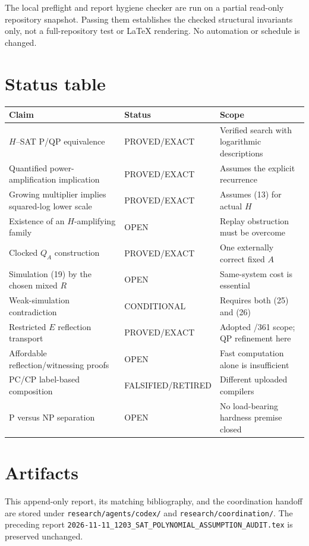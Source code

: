 \documentclass[11pt]{article}
\begin{document}
The local preflight and report hygiene checker are run on a partial
read-only repository snapshot. Passing them establishes the checked
structural invariants only, not a full-repository test or LaTeX rendering.
No automation or schedule is changed.

\section*{Status table}
\begin{longtable}{p{}p{}p{}}
\toprule
Claim & Status & Scope \\
\midrule
$H$--SAT P/QP equivalence & PROVED/EXACT & Verified search with logarithmic descriptions \\
Quantified power-amplification implication & PROVED/EXACT & Assumes the explicit recurrence \\
Growing multiplier implies squared-log lower scale & PROVED/EXACT & Assumes (13) for actual $H$ \\
Existence of an $H$-amplifying family & OPEN & Replay obstruction must be overcome \\
Clocked $Q_A$ construction & PROVED/EXACT & One externally correct fixed $A$ \\
Simulation (19) by the chosen mixed $R$ & OPEN & Same-system cost is essential \\
Weak-simulation contradiction & CONDITIONAL & Requires both (25) and (26) \\
Restricted $E$ reflection transport & PROVED/EXACT & Adopted /361 scope; QP refinement here \\
Affordable reflection/witnessing proofs & OPEN & Fast computation alone is insufficient \\
PC/CP label-based composition & FALSIFIED/RETIRED & Different uploaded compilers \\
P versus NP separation & OPEN & No load-bearing hardness premise closed \\
\bottomrule
\end{longtable}

\section*{Artifacts}
This append-only report, its matching bibliography, and the coordination
handoff are stored under \texttt{research/agents/codex/} and
\texttt{research/coordination/}. The preceding report
\texttt{2026-11-11\_1203\_SAT\_POLYNOMIAL\_ASSUMPTION\_AUDIT.tex}
is preserved unchanged.
\end{document}
